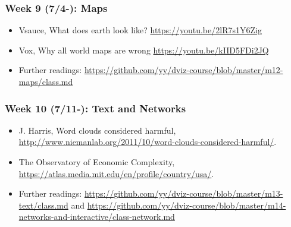 
\subsubsection{Week 9 (7/4-): Maps }%

\begin{itemize}\itemsep0em 
\item Vsauce, What does earth look like? \url{https://youtu.be/2lR7s1Y6Zig}
\item Vox, Why all world maps are wrong \url{https://youtu.be/kIID5FDi2JQ}
\item Further readings: \url{https://github.com/yy/dviz-course/blob/master/m12-maps/class.md}
\end{itemize}	
\subsubsection{Week 10 (7/11-): Text and Networks } %

\begin{itemize}\itemsep0em 
\item J. Harris, Word clouds considered harmful, \url{http://www.niemanlab.org/2011/10/word-clouds-considered-harmful/}. 
\item The Observatory of Economic Complexity, \url{https://atlas.media.mit.edu/en/profile/country/usa/}.
\item Further readings: \url{https://github.com/yy/dviz-course/blob/master/m13-text/class.md} and \url{https://github.com/yy/dviz-course/blob/master/m14-networks-and-interactive/class-network.md}
\end{itemize}	
